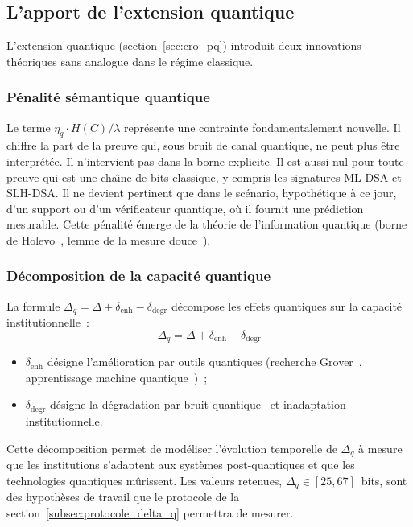 \subsection{L'apport de l'extension quantique}
\label{subsec:apport_extension_quantique}
\begin{sloppypar}
L'extension quantique (section~\ref{sec:cro_pq}) introduit deux
innovations th\'eoriques sans analogue dans le r\'egime classique.

\subsubsection{P\'enalit\'e s\'emantique quantique}
\label{subsubsec:penalite_semantique}

Le terme $\eta_q \cdot H(C)/\lambda$ repr\'esente une contrainte
fondamentalement nouvelle. Il chiffre la part de la preuve qui, sous
bruit de canal quantique, ne peut plus \^etre interpr\'et\'ee. Il
n'intervient pas dans la borne explicite. Il est aussi nul pour toute preuve
qui est une cha\^{\i}ne de bits classique, y compris les signatures ML-DSA et
SLH-DSA. Il ne devient pertinent que dans le sc\'enario, hypoth\'etique \`a ce
jour, d'un support ou d'un v\'erificateur quantique, o\`u il fournit une
pr\'ediction mesurable.
Cette p\'enalit\'e \'emerge de la th\'eorie de l'information quantique
(borne de Holevo~\cite{Holevo1973}, lemme de la mesure
douce~\cite{Winter1999,Ozawa2000}).

\subsubsection{D\'ecomposition de la capacit\'e quantique}
\label{subsubsec:decomposition_capacite_quantique}

La formule $\Delta_q = \Delta + \delta_{\text{enh}} - \delta_{\text{degr}}$
d\'ecompose les effets quantiques sur la capacit\'e
institutionnelle~:
\begin{equation}
\Delta_q = \Delta + \delta_{\text{enh}} - \delta_{\text{degr}}
\label{eq:decomposition_delta_q_discussion}
\end{equation}
\begin{itemize}
  \item $\delta_{\text{enh}}$ d\'esigne l'am\'elioration par outils quantiques
    (recherche Grover~\cite{Grover96}, apprentissage machine
    quantique~\cite{Biamonte2017})~;
  \item $\delta_{\text{degr}}$ d\'esigne la d\'egradation par bruit
    quantique~\cite{Preskill1998,Devoret2013} et inadaptation
    institutionnelle.
\end{itemize}
Cette d\'ecomposition permet de mod\'eliser l'\'evolution temporelle de
$\Delta_q$ \`a mesure que les institutions s'adaptent aux syst\`emes
post-quantiques et que les technologies quantiques
m\^urissent. Les valeurs retenues, $\Delta_q \in [25, 67]$~bits, sont
des hypoth\`eses de travail que le protocole de la
section~\ref{subsec:protocole_delta_q} permettra de mesurer.
\end{sloppypar}

